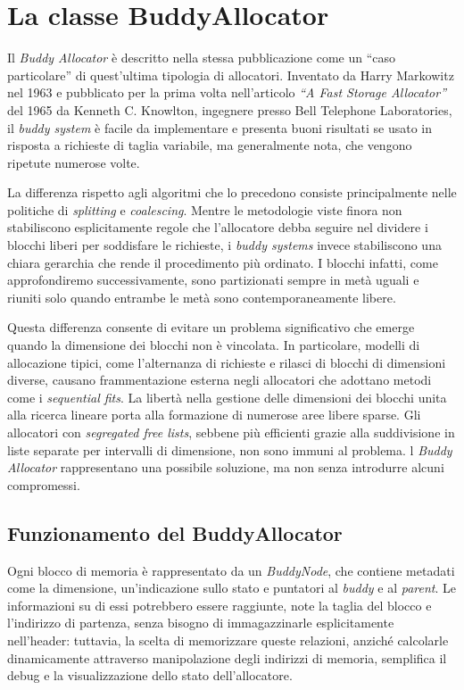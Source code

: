 \section{La classe BuddyAllocator}
Il \textit{Buddy Allocator} è descritto nella stessa pubblicazione come un “caso particolare” di quest'ultima tipologia di allocatori. Inventato da Harry Markowitz nel 1963 e pubblicato per la prima volta nell’articolo \textit{“A Fast Storage Allocator”}~\cite{knowlton1965} del 1965 da Kenneth C. Knowlton, ingegnere presso Bell Telephone Laboratories, il \textit{buddy system} è facile da implementare e presenta buoni risultati se usato in risposta a richieste di taglia variabile, ma generalmente nota, che vengono ripetute numerose volte.
 
La differenza rispetto agli algoritmi che lo precedono consiste principalmente nelle politiche di \textit{splitting} e \textit{coalescing}. Mentre le metodologie viste finora non stabiliscono esplicitamente regole che l'allocatore debba seguire nel dividere i blocchi liberi per soddisfare le richieste, i \textit{buddy systems} invece stabiliscono una chiara gerarchia che rende il procedimento più ordinato. I blocchi infatti, come approfondiremo successivamente, sono partizionati sempre in metà uguali e riuniti solo quando entrambe le metà sono contemporaneamente libere.

Questa differenza consente di evitare un problema significativo che emerge quando la dimensione dei blocchi non è vincolata. In particolare, modelli di allocazione tipici, come l'alternanza di richieste e rilasci di blocchi di dimensioni diverse, causano frammentazione esterna negli allocatori che adottano metodi come i \textit{sequential fits}. La libertà nella gestione delle dimensioni dei blocchi unita alla ricerca lineare porta alla formazione di numerose aree libere sparse. Gli allocatori con \textit{segregated free lists}, sebbene più efficienti grazie alla suddivisione in liste separate per intervalli di dimensione, non sono immuni al problema. l \textit{Buddy Allocator} rappresentano una possibile soluzione, ma non senza introdurre alcuni compromessi.

\subsection*{Funzionamento del BuddyAllocator}
Ogni blocco di memoria è rappresentato da un \textit{BuddyNode}, che contiene metadati come la dimensione, un’indicazione sullo stato e puntatori al \textit{buddy} e al \textit{parent}. Le informazioni su di essi potrebbero essere raggiunte, note la taglia del blocco e l’indirizzo di partenza, senza bisogno di immagazzinarle esplicitamente nell’header: tuttavia, la scelta di memorizzare queste relazioni, anziché calcolarle dinamicamente attraverso manipolazione degli indirizzi di memoria, semplifica il debug e la visualizzazione dello stato dell'allocatore.

